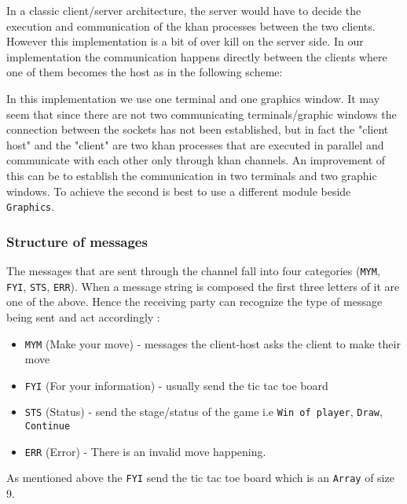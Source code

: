 \documentclass{article}
\begin{document}
In a classic client/server architecture, the server would have to decide the execution and communication of the khan processes between the two clients. However this implementation is a bit of over kill on the server side. In our implementation the communication happens directly between the clients where one of them becomes the host as in the following scheme:


In this implementation we use one terminal and one graphics window. It may seem that since there are not two communicating terminals/graphic windows the connection between the sockets has not been established, but in fact the "client host" and the "client" are two khan processes that are executed in parallel and communicate with each other only through khan channels. An improvement of this can be to establish the communication in two terminals and two graphic windows. To achieve the second is best to use a different module beside \texttt{Graphics}. 

\subsubsection{Structure of messages}
The messages that are sent through the channel fall into four categories (\texttt{MYM}, \texttt{FYI}, \texttt{STS}, \texttt{ERR}). When a message string is composed the first three letters of it are one of the above. Hence the receiving party can recognize the type of message being sent and act accordingly :
\begin{itemize}
\item \texttt{MYM} (Make your move) - messages the client-host asks the client to make their move
\item \texttt{FYI} (For your information) - usually send the tic tac toe board
\item \texttt{STS} (Status) - send the stage/status of the game i.e \texttt{Win of player}, \texttt{Draw}, \texttt{Continue}
\item \texttt{ERR} (Error) - There is an invalid move happening.
\end{itemize} 
As mentioned above the \texttt{FYI} send the tic tac toe board which is an \texttt{Array} of size 9. 
\end{document}
